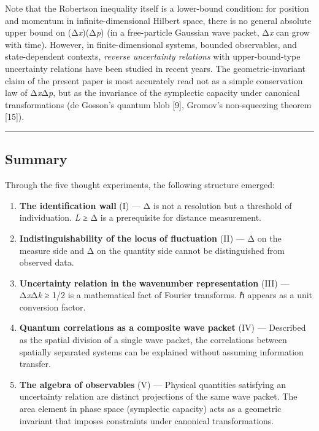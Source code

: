 \documentclass[
  11pt,
]{article}
\providecommand{\tightlist}{%
  \setlength{\itemsep}{0pt}\setlength{\parskip}{0pt}}
\begin{document}
Note that the Robertson inequality itself is a lower-bound condition:
for position and momentum in infinite-dimensional Hilbert space, there
is no general absolute upper bound on (Δ\emph{x})(Δ\emph{p}) (in a
free-particle Gaussian wave packet, Δ\emph{x} can grow with time).
However, in finite-dimensional systems, bounded observables, and
state-dependent contexts, \emph{reverse uncertainty relations} with
upper-bound-type uncertainty relations have been studied in recent
years. The geometric-invariant claim of the present paper is most
accurately read not as a simple conservation law of Δ\emph{x}Δ\emph{p},
but as the invariance of the symplectic capacity under canonical
transformations (de Gosson's quantum blob {[}9{]}, Gromov's
non-squeezing theorem {[}15{]}).

\begin{center}\rule{0.5\linewidth}{0.5pt}\end{center}

\subsection{Summary}\label{summary}

Through the five thought experiments, the following structure emerged:

\begin{enumerate}
\def\labelenumi{\arabic{enumi}.}
\tightlist
\item
  \textbf{The identification wall} (I) --- Δ is not a resolution but a
  threshold of individuation. \emph{L} ≥ Δ is a prerequisite for
  distance measurement.
\item
  \textbf{Indistinguishability of the locus of fluctuation} (II) --- Δ
  on the measure side and Δ on the quantity side cannot be distinguished
  from observed data.
\item
  \textbf{Uncertainty relation in the wavenumber representation} (III)
  --- Δ\emph{x}Δ\emph{k} ≥ 1/2 is a mathematical fact of Fourier
  transforms. ℏ appears as a unit conversion factor.
\item
  \textbf{Quantum correlations as a composite wave packet} (IV) ---
  Described as the spatial division of a single wave packet, the
  correlations between spatially separated systems can be explained
  without assuming information transfer.
\item
  \textbf{The algebra of observables} (V) --- Physical quantities
  satisfying an uncertainty relation are distinct projections of the
  same wave packet. The area element in phase space (symplectic
  capacity) acts as a geometric invariant that imposes constraints under
  canonical transformations.
\end{enumerate}
\end{document}
